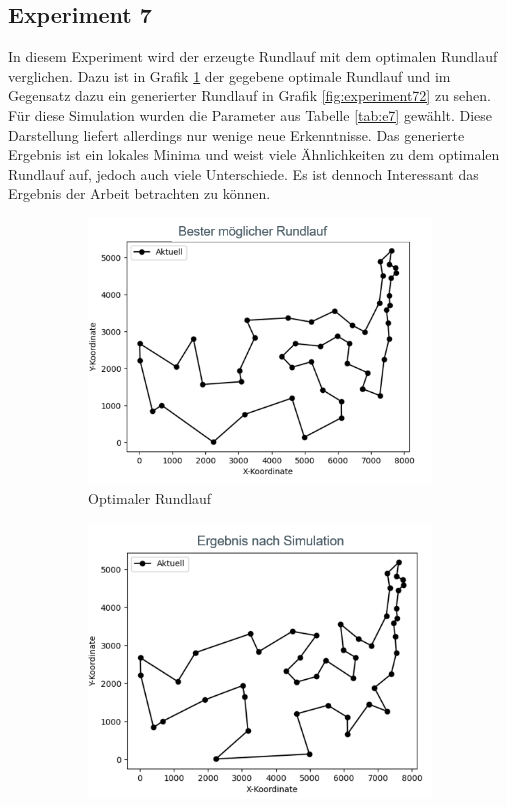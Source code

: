 \subsection{Experiment 7}
In diesem Experiment wird der erzeugte Rundlauf mit dem optimalen Rundlauf verglichen. Dazu ist in Grafik \ref{fig:experiment71} der gegebene optimale Rundlauf und im Gegensatz dazu ein generierter Rundlauf in Grafik \ref{fig:experiment72} zu sehen. Für diese Simulation wurden die Parameter aus Tabelle \ref{tab:e7} gewählt. Diese Darstellung liefert allerdings nur wenige neue Erkenntnisse. Das generierte Ergebnis ist ein lokales Minima und weist viele Ähnlichkeiten zu dem optimalen Rundlauf auf, jedoch auch viele Unterschiede. Es ist dennoch Interessant das Ergebnis der Arbeit betrachten zu können.

\begin{figure}
	\centering
	\begin{subfigure}[Optimum]{0.49\textwidth}
		\includegraphics[width=\textwidth]{img/Vortrag/experiment7_1.png}
		\caption{Optimaler Rundlauf}
		\label{fig:experiment71}
	\end{subfigure}
	\begin{subfigure}[Simulation]{0.49\textwidth}
		\includegraphics[width=\textwidth]{img/Vortrag/experiment7_2.png}

\end{subfigure}
\end{figure}
